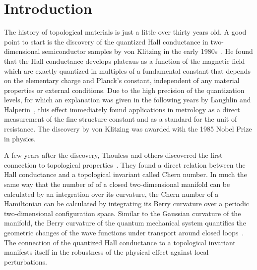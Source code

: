 \chapter*{Introduction}

The history of topological materials is just a little over thirty years old.
A good point to start is the discovery of the quantized Hall conductance in two-dimensional semiconductor samples by von Klitzing in the early 1980s~\cite{Klitzing1980,Klitzing1992}.
He found that the Hall conductance develops plateaus as a function of the magnetic field which are exactly quantized in multiples of a fundamental constant that depends on the elementary charge and Planck's constant, independent of any material properties or external conditions.
Due to the high precision of the quantization levels, for which an explanation was given in the following years by Laughlin and Halperin~\cite{Laughlin1981,Halperin1982}, this effect immediately found applications in metrology as a direct measurement of the fine structure constant and as a standard for the unit of resistance.
The discovery by von Klitzing was awarded with the 1985 Nobel Prize in physics.

A few years after the discovery, Thouless and others discovered the first connection to topological properties~\cite{Thouless1982,Niu1985,Kohmoto1985,Avron1985,Kohmoto1989,Bellissard1994,Avron2003}.
They found a direct relation between the Hall conductance and a topological invariant called Chern number.
In much the same way that the number of  of a closed two-dimensional manifold can be calculated by an integration over its curvature, the Chern number of a Hamiltonian can be calculated by integrating its Berry curvature over a periodic two-dimensional configuration space.
Similar to the Gaussian curvature of the manifold, the Berry curvature of the quantum mechanical system quantifies the geometric changes of the wave functions under transport around closed loops~\cite{Berry1984,Zak1989}.
The connection of the quantized Hall conductance to a topological invariant manifests itself in the robustness of the physical effect against local perturbations.

